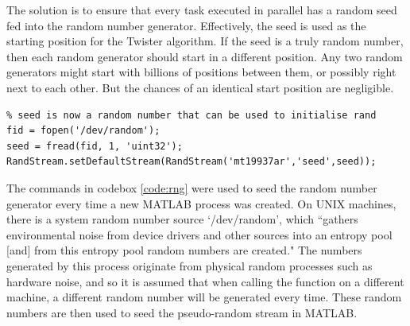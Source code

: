 \documentclass[11pt]{article}
\numberwithin{equation}{subsection}
\begin{document}
The solution is to ensure that every task executed in parallel has a random seed fed into the random number generator. Effectively, the seed is used as the starting position for the Twister algorithm. If the seed is a truly random number, then each random generator should start in a different position. Any two random generators might start with billions of positions between them, or possibly right next to each other. But the chances of an identical start position are negligible.

\begin{lstlisting}[float=ht,style=Matlab-editor,caption = {Seeding random generator},label=code:rng]
% Ensures truly random numbers for each process
% seed is now a random number that can be used to initialise rand
fid = fopen('/dev/random');
seed = fread(fid, 1, 'uint32');
RandStream.setDefaultStream(RandStream('mt19937ar','seed',seed));
\end{lstlisting}

The commands in codebox \ref{code:rng} were used to seed the random number generator every time a new MATLAB process was created. On UNIX machines, there is a system random number source \mbox{`/dev/random'}, which ``gathers environmental noise from device drivers and other sources into an entropy pool [and] from this entropy pool random numbers are created." The numbers generated by this process originate from physical random processes such as hardware noise, and so it is assumed that when calling the function on a different machine, a different random number will be generated every time. These random numbers are then used to seed the pseudo-random stream in MATLAB. 
\end{document}
